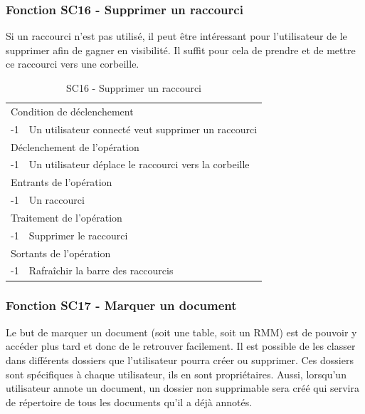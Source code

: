 \documentclass[a4paper]{article}
\begin{document}
\subsubsection{Fonction SC16 - Supprimer un raccourci}
Si un raccourci n’est pas utilisé, il peut être intéressant pour l’utilisateur de le supprimer afin de gagner en visibilité. Il suffit pour cela de prendre et de mettre ce raccourci vers une corbeille.\\
\begin{table}[H]
  \centering
   \small
	\begin{tabular}{|c|p{12cm}|}
   		\hline
   			\rowcolor{lightgray}\multicolumn{2}{|c|}{\textbf{SC16 - Supprimer un raccourci}} \\
   		\hline
   			\multicolumn{2}{|l|}{Condition de d\'eclenchement} \\
   		\hline
   			-1 & Un utilisateur connecté veut supprimer un raccourci\\
   		\hline
   			\multicolumn{2}{|l|}{D\'eclenchement de l'op\'eration} \\
   		\hline
   			-1 & Un utilisateur déplace le raccourci vers la corbeille\\
   		\hline
   			\multicolumn{2}{|l|}{Entrants de l'op\'eration} \\
   		\hline
   			-1 &  Un raccourci \\
   		\hline
   			\multicolumn{2}{|l|}{Traitement de l'op\'eration} \\
  		\hline
   			-1 & Supprimer le raccourci\\
   		\hline
   			\multicolumn{2}{|l|}{Sortants de l'op\'eration} \\
   		\hline
   			-1 & Rafraîchir la barre des raccourcis\\
   		\hline
	\end{tabular}
  \caption{SC16 - Supprimer un raccourci}
  \normalsize
  \label{tab:supprimer_raccourci}
\end{table}



\subsubsection{Fonction SC17 - Marquer un document}
Le but de marquer un document (soit une table, soit un RMM) est de pouvoir y accéder plus tard et donc de le retrouver facilement. Il est possible de les classer dans différents dossiers que l'utilisateur pourra créer ou supprimer. Ces dossiers sont sp\'ecifiques \`a chaque utilisateur, ils en sont propriétaires. Aussi, lorsqu'un utilisateur annote un document, un dossier non supprimable sera créé qui servira de répertoire de tous les documents qu'il a déjà annotés. 
\end{document}
